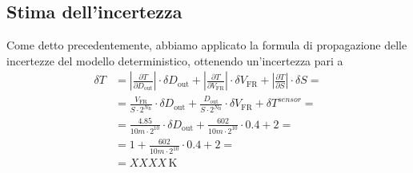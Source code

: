 \documentclass[a4paper]{article}
\newcommand\abs[1]{\left|#1\right|}
\begin{document}
		\subsection{Stima dell'incertezza}
			Come detto precedentemente, abbiamo applicato la formula di propagazione delle incertezze del modello deterministico, ottenendo un'incertezza pari a
			\begin{equation*}
				\begin{split}
					\delta T &= \abs{\frac{\partial T}{\partial D_{\mathrm{out}}}} \cdot \delta D_{\mathrm{out}} + \abs{\frac{\partial T}{\partial V_{\mathrm{FR}}}} \cdot \delta V_{\mathrm{FR}} + \abs{\frac{\partial T}{\partial S}} \cdot \delta S = \\
							 &= \frac{V_{\mathrm{FR}}}{S \cdot 2^{N_{\mathrm{B}}}} \cdot \delta D_{\mathrm{out}} + \frac{D_{\mathrm{out}}}{S \cdot 2^{N_{\mathrm{B}}}} \cdot \delta V_{\mathrm{FR}} + \delta T^{sensor} = \\
							 &= \frac{4.85}{10m \cdot 2^{10}} \cdot \delta D_{\mathrm{out}} + \frac{602}{10m \cdot 2^{10}} \cdot 0.4 + 2 = \\
							 &= 1 + \frac{602}{10m \cdot 2^{10}} \cdot 0.4 + 2 = \\
							 &= XXXX \, \mathrm{K}
				\end{split}
			\end{equation*}
\end{document}
